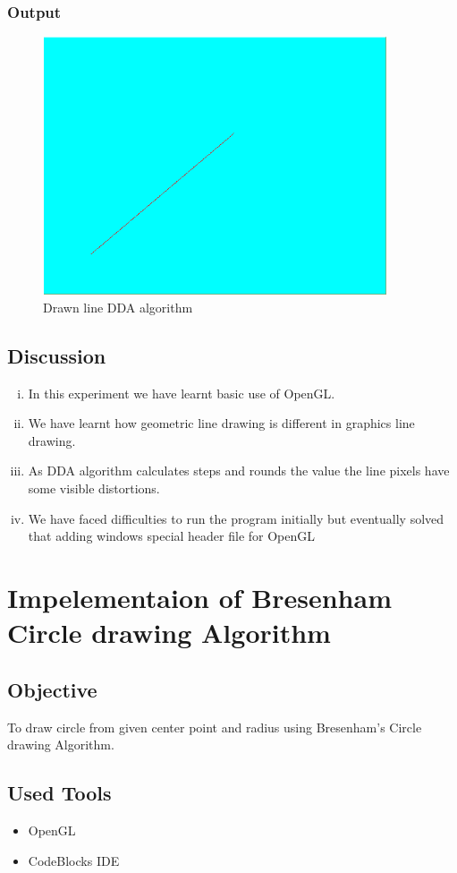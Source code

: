 \documentclass[11pt]{report}
\begin{document}
\subsection{Output}
\begin{figure}[!htb]
	\centering
	\includegraphics[height=3.0in,width=4in]{dda}
	\caption{Drawn line DDA algorithm}
\end{figure}

\section{Discussion}
\begin{enumerate}[(i)]
	\item In this experiment we have learnt basic use of OpenGL.
	\item We have learnt how geometric line drawing is different in graphics line drawing.
	\item As DDA algorithm calculates steps and rounds the value the line pixels have some visible distortions.
	\item We have faced difficulties to run the program initially but eventually solved that adding windows special header file for OpenGL
\end{enumerate}


\chapter{Impelementaion of Bresenham Circle drawing Algorithm}
\section{Objective}
To draw circle from given center point and radius using Bresenham’s Circle drawing Algorithm.
\section{Used Tools}
\begin{itemize}
	\item OpenGL
	\item CodeBlocks IDE
\end{itemize}
\end{document}
